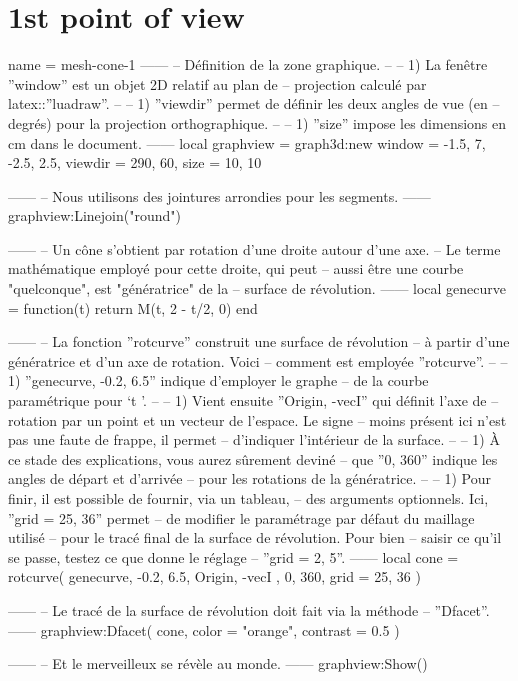 \documentclass[varwidth, border = 3pt]{standalone}
\begin{document}
\section*{1st point of view}

\begin{luadraw}{name = mesh-cone-1}
------
-- Définition de la zone graphique.
--
--     1) La fenêtre ''window'' est un objet 2D relatif au plan de
--     projection calculé par latex::''luadraw''.
--
--     1) ''viewdir'' permet de définir les deux angles de vue (en
--     degrés) pour la projection orthographique.
--
--     1) ''size'' impose les dimensions en cm dans le document.
------
local graphview = graph3d:new{
  window  = {-1.5, 7, -2.5, 2.5},
  viewdir = {290, 60},
  size    = {10, 10}
}

------
-- Nous utilisons des jointures arrondies pour les segments.
------
graphview:Linejoin("round")

------
-- Un cône s'obtient par rotation d'une droite autour d'une axe.
-- Le terme mathématique employé pour cette droite, qui peut
-- aussi être une courbe "quelconque", est "génératrice" de la
-- surface de révolution.
------
local genecurve = function(t)
  return M(t, 2 - t/2, 0)
end

------
-- La fonction ''rotcurve'' construit une surface de révolution
-- à partir d'une génératrice et d'un axe de rotation. Voici
-- comment est employée ''rotcurve''.
--
--     1) ''genecurve, -0.2, 6.5'' indique d'employer le graphe
--     de la courbe paramétrique pour `t \in [-0.2 .. 6.5]'.
--
--     1) Vient ensuite ''{Origin, -vecI}'' qui définit l'axe de
--     rotation par un point et un vecteur de l'espace. Le signe
--     moins présent ici n'est pas une faute de frappe, il permet
--     d'indiquer l'intérieur de la surface.
--
--     1) À ce stade des explications, vous aurez sûrement deviné
--     que ''0, 360'' indique les angles de départ et d'arrivée
--     pour les rotations de la génératrice.
--
--     1) Pour finir, il est possible de fournir, via un tableau,
--     des arguments optionnels. Ici, ''grid = {25, 36}'' permet
--     de modifier le paramétrage par défaut du maillage utilisé
--     pour le tracé final de la surface de révolution. Pour bien
--     saisir ce qu'il se passe, testez ce que donne le réglage
--     ''grid = {2, 5}''.
------
local cone = rotcurve(
  genecurve, -0.2, 6.5,
  {
    Origin, -vecI
  },
  0, 360,
  {
    grid = {25, 36}
  })

------
-- Le tracé de la surface de révolution doit fait via la méthode
-- ''Dfacet''.
------
graphview:Dfacet(
  cone,
  {
    color  = "orange",
    contrast = 0.5
  })

------
-- Et le merveilleux se révèle au monde.
------
graphview:Show()
\end{luadraw}
\end{document}
